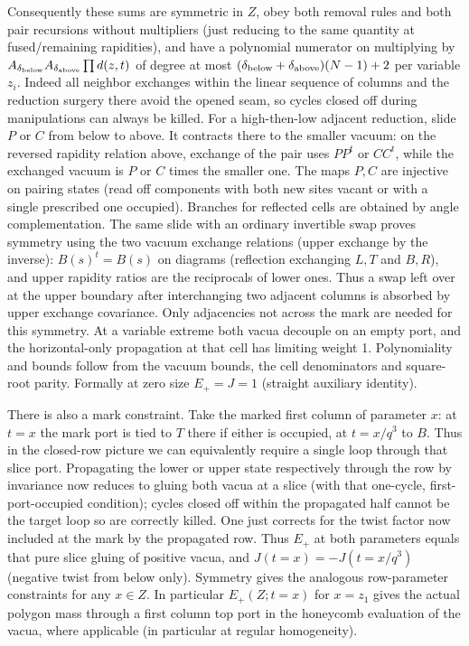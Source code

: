 Consequently these sums are symmetric in \(Z\), obey both removal rules and both pair recursions without multipliers (just reducing to the same quantity at fused/remaining rapidities), and have a polynomial numerator on multiplying by \(A_{\delta_{\rm below}} A_{\delta_{\rm above}}\prod d(z,t)\) of degree at most \((\delta_{\rm below}+\delta_{\rm above})(N-1)+2\) per variable \(z_i\). Indeed all neighbor exchanges within the linear sequence of columns and the reduction surgery there avoid the opened seam, so cycles closed off during manipulations can always be killed. For a high-then-low adjacent reduction, slide \(P\) or \(C\) from below to above. It contracts there to the smaller vacuum: on the reversed rapidity relation above, exchange of the pair uses \(PP^t\) or \(CC^t\), while the exchanged vacuum is \(P\) or \(C\) times the smaller one. The maps \(P,C\) are injective on pairing states (read off components with both new sites vacant or with a single prescribed one occupied). Branches for reflected cells are obtained by angle complementation. The same slide with an ordinary invertible swap proves symmetry using the two vacuum exchange relations (upper exchange by the inverse): \(B(s)^t=B(s)\) on diagrams (reflection exchanging \(L,T\) and \(B,R\)), and upper rapidity ratios are the reciprocals of lower ones. Thus a swap left over at the upper boundary after interchanging two adjacent columns is absorbed by upper exchange covariance. Only adjacencies not across the mark are needed for this symmetry. At a variable extreme both vacua decouple on an empty port, and the horizontal-only propagation at that cell has limiting weight 1. Polynomiality and bounds follow from the vacuum bounds, the cell denominators and square-root parity. Formally at zero size \(E_+=J=1\) (straight auxiliary identity).

There is also a mark constraint. Take the marked first column of parameter \(x\): at \(t=x\) the mark port is tied to \(T\) there if either is occupied, at \(t=x/q^3\) to \(B\). Thus in the closed-row picture we can equivalently require a single loop through that slice port. Propagating the lower or upper state respectively through the row by invariance now reduces to gluing both vacua at a slice (with that one-cycle, first-port-occupied condition); cycles closed off within the propagated half cannot be the target loop so are correctly killed. One just corrects for the twist factor now included at the mark by the propagated row. Thus \(E_+\) at both parameters equals that pure slice gluing of positive vacua, and \(J(t=x)=-J(t=x/q^3)\) (negative twist from below only). Symmetry gives the analogous row-parameter constraints for any \(x\in Z\). In particular \(E_+(Z;t=x)\) for \(x=z_1\) gives the actual polygon mass through a first column top port in the honeycomb evaluation of the vacua, where applicable (in particular at regular homogeneity).

